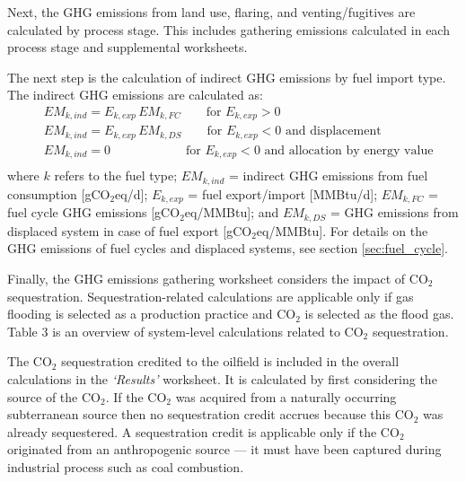 \documentclass[11pt]{report}
\newcommand{\marg}[1]{{\footnotesize\textit{\textcolor{stanford}{'#1'}}}}
\newcommand{\marginnote}[1]{\marginpar{\marg{#1}}}
\newcommand{\sheet}[1]{\textit{`{#1}'}}
\begin{document}
Next, \marginnote{GHG \\ Emissions Table 1} the GHG emissions from land use, flaring, and venting/fugitives are calculated by process stage. This includes gathering emissions calculated in each process stage and supplemental worksheets.

The next step \marginnote{GHG \\ Emissions Table 2} is the calculation of indirect GHG emissions by fuel import type. The indirect GHG emissions are calculated as:
\begin{equation}
\begin{split}
& EM_{k,ind} = E_{k,exp} \, EM_{k,FC} \quad\quad \text{for}\,\, E_{k,exp} > 0\\
& EM_{k,ind} = E_{k,exp} \, EM_{k,DS} \quad\quad \text{for}\,\, E_{k,exp} < 0 \,\,\text{and displacement}\\
& EM_{k,ind} = 0 \quad\quad\quad\quad\quad\quad \text{for}\,\, E_{k,exp} < 0 \,\,\text{and allocation by energy value}\\
\end{split}
\end{equation} 
where $k$ refers to the fuel type; $EM_{k,ind}$ = indirect GHG emissions from fuel consumption [gCO$_{2}$eq/d]; $E_{k,exp}$ = fuel export/import [MMBtu/d]; $EM_{k,FC}$ = fuel cycle GHG emissions [gCO$_{2}$eq/MMBtu]; and $EM_{k,DS}$ = GHG emissions from displaced system in case of fuel export [gCO$_{2}$eq/MMBtu]. For details on the GHG emissions of fuel cycles and displaced systems, see section \ref{sec:fuel_cycle}.

Finally, the GHG emissions gathering worksheet considers the impact \marginnote{GHG \\ Emissions Table 3} of CO$_2$ sequestration. Sequestration-related calculations are applicable only if gas flooding is selected as a production practice and CO$_2$ is selected as the flood gas. Table 3 is an overview of system-level calculations related to CO$_2$ sequestration. 

The CO$_2$ sequestration credited to the oilfield is included in the overall calculations in the \sheet{Results} worksheet. It is calculated by first considering the source of the CO$_2$. \marginnote{Active Field 2.4.7.2} If the CO$_2$ was acquired from a naturally occurring subterranean source then no sequestration credit accrues because this CO$_2$ was already sequestered. A sequestration credit is applicable only if the CO$_2$ originated from an anthropogenic source --- it must have been captured during industrial process such as coal combustion. 
\end{document}
